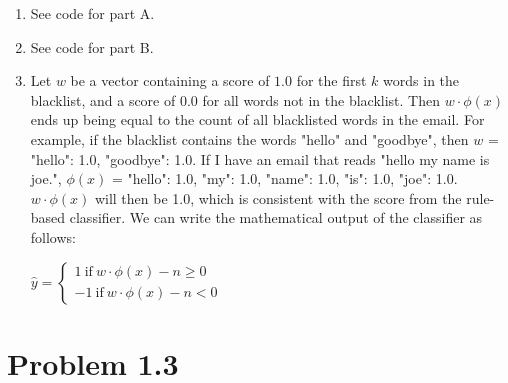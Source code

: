 \documentclass[12pt]{article}
\begin{document}
\begin{enumerate}[label=(\alph*)]
  \item See code for part A.
  \item See code for part B.
  \item Let $w$ be a vector containing a score of $1.0$ for the first $k$ words in the blacklist, and a score of $0.0$ for all words not in the blacklist. Then $w \cdot \phi(x)$ ends up being equal to the count of all blacklisted words in the email. For example, if the blacklist contains the words "hello" and "goodbye", then $w$ = {"hello": 1.0, "goodbye": 1.0}. If I have an email that reads "hello my name is joe.", $\phi(x)$ = {"hello": 1.0, "my": 1.0, "name": 1.0, "is": 1.0, "joe": 1.0}. $w \cdot \phi(x)$ will then be 1.0, which is consistent with the score from the rule-based classifier. We can write the mathematical output of the classifier as follows:

  $\hat y = \left\{ \begin{matrix} 
	1 ~\textrm{if}~ w \cdot \phi(x) - n \ge 0\\
	-1 ~\textrm{if}~ w \cdot \phi(x) - n< 0
	\end{matrix}\right.$
\end{enumerate}

\section*{Problem 1.3}
\end{document}
